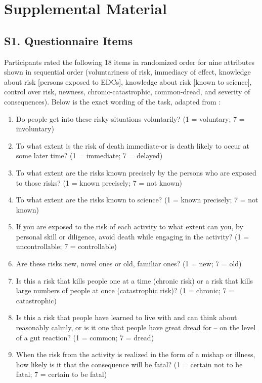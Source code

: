 \clearpage

\pagestyle{noheaderpagenum}
\thispagestyle{noheaderpagenum}
\markboth{}{}

\setcounter{secnumdepth}{0}

\setcounter{table}{0}
\renewcommand{\thetable}{S\arabic{table}}

\setcounter{figure}{0}
\renewcommand{\thefigure}{S\arabic{figure}}

\section{Supplemental Material}

\subsection{S1. Questionnaire Items}
Participants rated the following 18 items in randomized order for nine attributes shown in sequential order (voluntariness of risk, immediacy of effect, knowledge about risk [persons exposed to EDCs], knowledge about risk [known to science], control over risk, newness, chronic-catastrophic, common-dread, and severity of consequences). Below is the exact wording of the task, adapted from \citet{fischhoff1978safe}:

\begin{enumerate}
    \item Do people get into these risky situations voluntarily? (1 = voluntary; 7 = involuntary)
    \item To what extent is the risk of death immediate-or is death likely to occur at some later time? (1 = immediate; 7 = delayed)
    \item To what extent are the risks known precisely by the persons who are exposed to those risks? (1 = known precisely; 7 = not known)
    \item To what extent are the risks known to science? (1 = known precisely; 7 = not known)
    \item If you are exposed to the risk of each activity to what extent can you, by personal skill or diligence, avoid death while engaging in the activity? (1 = uncontrollable; 7 = controllable)
    \item Are these risks new, novel ones or old, familiar ones? (1 = new; 7 = old)
    \item Is this a risk that kills people one at a time (chronic risk) or a risk that kills large numbers of people at once (catastrophic risk)? (1 = chronic; 7 = catastrophic)
    \item Is this a risk that people have learned to live with and can think about reasonably calmly, or is it one that people have great dread for -- on the level of a gut reaction? (1 = common; 7 = dread)
    \item When the risk from the activity is realized in the form of a mishap or illness, how likely is it that the consequence will be fatal? (1 = certain not to be fatal; 7 = certain to be fatal)
\end{enumerate}\leavevmode

